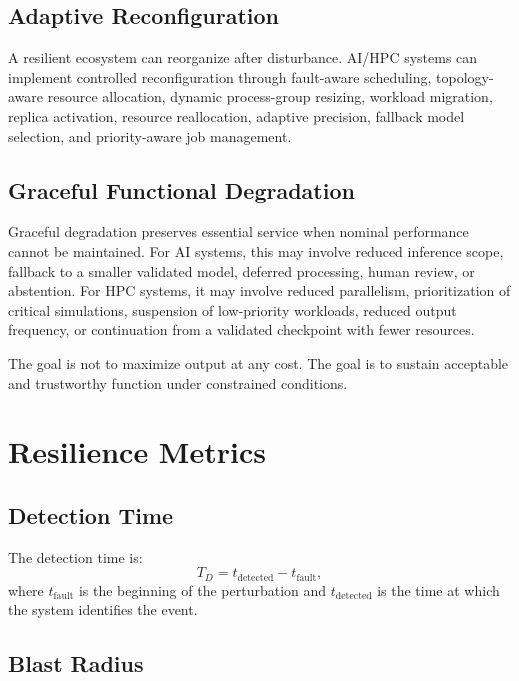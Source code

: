 \documentclass[conference]{IEEEtran}
\begin{document}
\subsection{Adaptive Reconfiguration}

A resilient ecosystem can reorganize after disturbance. AI/HPC systems can implement controlled reconfiguration through fault-aware scheduling, topology-aware resource allocation, dynamic process-group resizing, workload migration, replica activation, resource reallocation, adaptive precision, fallback model selection, and priority-aware job management.

\subsection{Graceful Functional Degradation}

Graceful degradation preserves essential service when nominal performance cannot be maintained. For AI systems, this may involve reduced inference scope, fallback to a smaller validated model, deferred processing, human review, or abstention. For HPC systems, it may involve reduced parallelism, prioritization of critical simulations, suspension of low-priority workloads, reduced output frequency, or continuation from a validated checkpoint with fewer resources.

The goal is not to maximize output at any cost. The goal is to sustain acceptable and trustworthy function under constrained conditions.

\section{Resilience Metrics}

\subsection{Detection Time}

The detection time is:
\begin{equation}
T_D = t_{\mathrm{detected}} - t_{\mathrm{fault}},
\end{equation}
where $t_{\mathrm{fault}}$ is the beginning of the perturbation and $t_{\mathrm{detected}}$ is the time at which the system identifies the event.

\subsection{Blast Radius}
\end{document}
